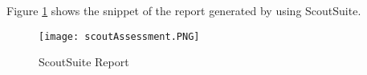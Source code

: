 Figure \ref{fig:deployscoutsuite} shows the snippet of
the report generated by using ScoutSuite.

\begin{figure}
    \centering
    \texttt{[image: scoutAssessment.PNG]}
    \caption{ScoutSuite Report}
    \label{fig:deployscoutsuite}
\end{figure}